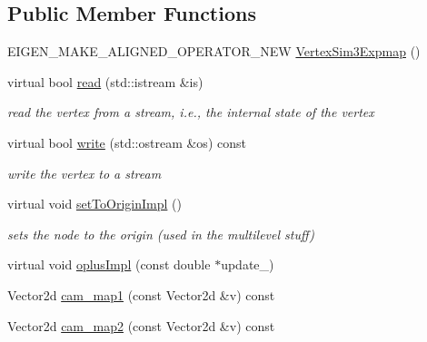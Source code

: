 \subsection*{Public Member Functions}
\begin{DoxyCompactItemize}
\item 
E\+I\+G\+E\+N\+\_\+\+M\+A\+K\+E\+\_\+\+A\+L\+I\+G\+N\+E\+D\+\_\+\+O\+P\+E\+R\+A\+T\+O\+R\+\_\+\+N\+EW \mbox{\hyperlink{classg2o_1_1_vertex_sim3_expmap_ac1f5a851bf896518998d8186723af365}{Vertex\+Sim3\+Expmap}} ()
\item 
virtual bool \mbox{\hyperlink{classg2o_1_1_vertex_sim3_expmap_a16b4ef216ad1c4709a6fc6aa452d8e61}{read}} (std\+::istream \&is)
\begin{DoxyCompactList}\small\item\em read the vertex from a stream, i.\+e., the internal state of the vertex \end{DoxyCompactList}\item 
virtual bool \mbox{\hyperlink{classg2o_1_1_vertex_sim3_expmap_ab5725f98a0d40f4cdb5d352a45c79fc7}{write}} (std\+::ostream \&os) const
\begin{DoxyCompactList}\small\item\em write the vertex to a stream \end{DoxyCompactList}\item 
virtual void \mbox{\hyperlink{classg2o_1_1_vertex_sim3_expmap_ab076d5964ab55f95251a75bcf341ce05}{set\+To\+Origin\+Impl}} ()
\begin{DoxyCompactList}\small\item\em sets the node to the origin (used in the multilevel stuff) \end{DoxyCompactList}\item 
virtual void \mbox{\hyperlink{classg2o_1_1_vertex_sim3_expmap_abef7e4d10825caa129984f69251508c2}{oplus\+Impl}} (const double $\ast$update\+\_\+)
\item 
Vector2d \mbox{\hyperlink{classg2o_1_1_vertex_sim3_expmap_a23848134729d617ed1b4adb0ec12d246}{cam\+\_\+map1}} (const Vector2d \&v) const
\item 
Vector2d \mbox{\hyperlink{classg2o_1_1_vertex_sim3_expmap_aa1fea182077bd192c547d6b59c874e1e}{cam\+\_\+map2}} (const Vector2d \&v) const
\end{DoxyCompactItemize}

